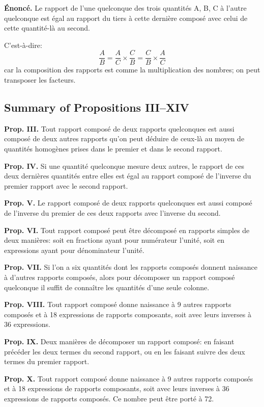 \documentclass[11pt,a4paper]{article}
\theoremstyle{plain}
\theoremstyle{definition}
\theoremstyle{remark}
\begin{document}
\textbf{Énoncé.} Le rapport de l'une quelconque des trois quantités A, B, C à l'autre quelconque est égal au rapport du tiers à cette dernière composé avec celui de cette quantité-là au second.

C'est-à-dire:
\[
\frac{A}{B} = \frac{A}{C} \times \frac{C}{B} = \frac{C}{B} \times \frac{A}{C}
\]
car la composition des rapports est comme la multiplication des nombres; on peut transposer les facteurs.


\subsection{Summary of Propositions III–XIV}
\label{sec:prop3-14}


\textbf{Prop. III.} Tout rapport composé de deux rapports quelconques est aussi composé de deux autres rapports qu'on peut déduire de ceux-là au moyen de quantités homogènes prises dans le premier et dans le second rapport.

\textbf{Prop. IV.} Si une quantité quelconque mesure deux autres, le rapport de ces deux dernières quantités entre elles est égal au rapport composé de l'inverse du premier rapport avec le second rapport.

\textbf{Prop. V.} Le rapport composé de deux rapports quelconques est aussi composé de l'inverse du premier de ces deux rapports avec l'inverse du second.

\textbf{Prop. VI.} Tout rapport composé peut être décomposé en rapports simples de deux manières: soit en fractions ayant pour numérateur l'unité, soit en expressions ayant pour dénominateur l'unité.

\textbf{Prop. VII.} Si l'on a six quantités dont les rapports composés donnent naissance à d'autres rapports composés, alors pour décomposer un rapport composé quelconque il suffit de connaître les quantités d'une seule colonne.

\textbf{Prop. VIII.} Tout rapport composé donne naissance à 9 autres rapports composés et à 18 expressions de rapports composants, soit avec leurs inverses à 36 expressions.

\textbf{Prop. IX.} Deux manières de décomposer un rapport composé: en faisant précéder les deux termes du second rapport, ou en les faisant suivre des deux termes du premier rapport.

\textbf{Prop. X.} Tout rapport composé donne naissance à 9 autres rapports composés et à 18 expressions de rapports composants, soit avec leurs inverses à 36 expressions de rapports composés. Ce nombre peut être porté à 72.
\end{document}
